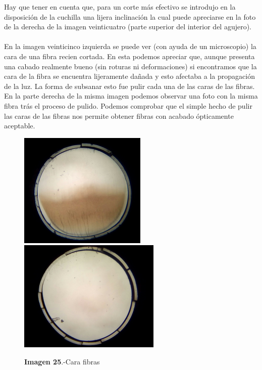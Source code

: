 \newpage
Hay que tener en cuenta que, para un corte más efectivo se introdujo en la disposición de la cuchilla una lijera inclinación la cual puede apreciarse en la foto de la derecha de la imagen veinticuatro (parte superior del interior del agujero). 

\paragraph {}
En la imagen veinticinco izquierda se puede ver (con ayuda de un microscopio) la cara de una fibra recien cortada. En esta podemos apreciar que, aunque presenta una cabado realmente bueno (sin roturas ni deformaciones) si encontramos que la cara de la fibra se encuentra lijeramente dañada y esto afectaba a la propagación de la luz. La forma de subsanar esto fue pulir cada una de las caras de las fibras. En la parte derecha de la misma imagen podemos observar una foto con la misma fibra trás el proceso de pulido. Podemos comprobar que el simple hecho de pulir las caras de las fibras nos permite obtener fibras con acabado ópticamente aceptable.

\begin{figure}[htb]
\centering
{
\includegraphics[scale=0.3]{SinPulir.png} 
}
{
\includegraphics[scale=0.3]{Pulida.png} 
}
\caption{\textbf{Imagen 25}.-Cara fibras}
\end{figure} 

